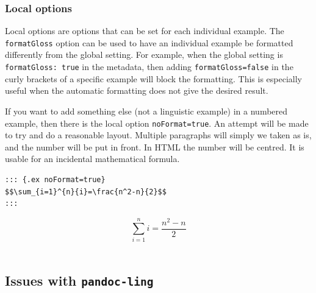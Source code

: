 \documentclass[
]{article}
\begin{document}
\hypertarget{local-options}{%
\subsubsection{Local options}\label{local-options}}

Local options are options that can be set for each individual example.
The \texttt{formatGloss} option can be used to have an individual
example be formatted differently from the global setting. For example,
when the global setting is \texttt{formatGloss:\ true} in the metadata,
then adding \texttt{formatGloss=false} in the curly brackets of a
specific example will block the formatting. This is especially useful
when the automatic formatting does not give the desired result.

If you want to add something else (not a linguistic example) in a
numbered example, then there is the local option \texttt{noFormat=true}.
An attempt will be made to try and do a reasonable layout. Multiple
paragraphs will simply we taken as is, and the number will be put in
front. In HTML the number will be centred. It is usable for an
incidental mathematical formula.

\begin{verbatim}
::: {.ex noFormat=true}
$$\sum_{i=1}^{n}{i}=\frac{n^2-n}{2}$$
:::
\end{verbatim}

\begin{samepage}
  \[\sum_{i=1}^{n}{i}=\frac{n^2-n}{2}\]\\
  
\xe
\end{samepage}

\hypertarget{issues-with-pandoc-ling}{%
\subsection{\texorpdfstring{Issues with
\texttt{pandoc-ling}}{Issues with pandoc-ling}}\label{issues-with-pandoc-ling}}
\end{document}
